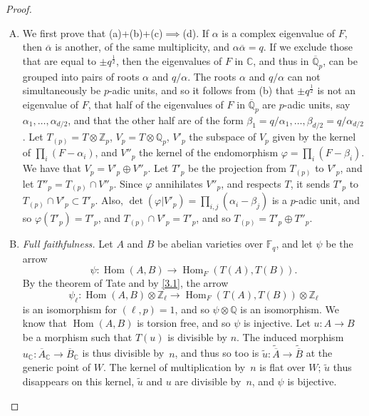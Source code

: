 \documentclass{article}
\newcommand{\FF}{\mathbb{F}}
\newcommand{\ZZ}{\mathbb{Z}}
\newcommand{\QQ}{\mathbb{Q}}
\newcommand{\CC}{\mathbb{C}}
\DeclareMathOperator{\Hom}{Hom}
\begin{document}
\begin{proof}
  \begin{enumerate}[(A)]
    \item We first prove that (a)+(b)+(c)$\implies$(d).
      If $\alpha$ is a complex eigenvalue of $F$, then $\overline{\alpha}$ is another, of the same multiplicity, and $\alpha\overline{\alpha}=q$.
      If we exclude those that are equal to $\pm q^{\frac12}$, then the eigenvalues of $F$ in $\CC$, and thus in $\overline{\QQ}_p$, can be grouped into pairs of roots $\alpha$ and $q/\alpha$.
      The roots $\alpha$ and $q/\alpha$ can not simultaneously be $p$-adic units, and so it follows from (b) that $\pm q^{\frac12}$ is not an eigenvalue of $F$, that half of the eigenvalues of $F$ in $\overline{\QQ}_p$ are $p$-adic units, say $\alpha_1,\ldots,\alpha_{d/2}$, and that the other half are of the form $\beta_1=q/\alpha_1,\ldots,\beta_{d/2}=q/\alpha_{d/2}$.
      Let $T_{(p)}=T\otimes\ZZ_p$, $V_p=T\otimes\QQ_p$, $V'_p$ the subspace of $V_p$ given by the kernel of $\prod_i(F-\alpha_i)$, and $V''_p$ the kernel of the endomorphism $\varphi=\prod_i(F-\beta_i)$.
      We have that $V_p=V'_p\oplus V''_p$.
      Let $T'_p$ be the projection from $T_{(p)}$ to $V'_p$, and let $T''_p=T_{(p)}\cap V''_p$.
      Since $\varphi$ annihilates $V''_p$, and respects $T$, it sends $T'_p$ to $T_{(p)}\cap V'_p\subset T'_p$.
      Also, $\det(\varphi|V'_p)=\prod_{i,j}(\alpha_i-\beta_j)$ is a $p$-adic unit, and so $\varphi(T'_p)=T'_p$, and $T_{(p)}\cap V'_p=T'_p$, and so $T_{(p)}=T'_p\oplus T''_p$.
    \item \emph{Full faithfulness.}
      Let $A$ and $B$ be abelian varieties over $\FF_q$, and let $\psi$ be the arrow
      \[
        \psi\colon \Hom(A,B) \to \Hom_F(T(A),T(B)).
      \]
      By the theorem of Tate \cite{7} and by \cref{3.1}, the arrow
      \[
        \psi_\ell\colon \Hom(A,B)\otimes\ZZ_\ell \to \Hom_F(T(A),T(B))\otimes\ZZ_\ell
      \]
      is an isomorphism for $(\ell,p)=1$, and so $\psi\otimes\QQ$ is an isomorphism.
      We know that $\Hom(A,B)$ is torsion free, and so $\psi$ is injective.
      Let $u\colon A\to B$ be a morphism such that $T(u)$ is divisible by $n$.
      The induced morphism $u_\CC\colon\overline{A}_\CC\to\overline{B}_\CC$ is thus divisible by~$n$, and thus so too is $\widetilde{u}\colon\widetilde{\overline{A}}\to\widetilde{\overline{B}}$ at the generic point of $W$.
      The kernel of multiplication by~$n$ is flat over $W$;
      $\widetilde{u}$ thus disappears on this kernel, $\widetilde{u}$ and $u$ are divisible by~$n$, and $\psi$ is bijective.

\end{enumerate}
\end{proof}
\end{document}
